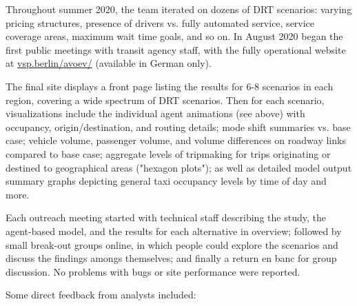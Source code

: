Throughout summer 2020, the team iterated on dozens of DRT scenarios: varying pricing structures, presence of drivers vs. fully automated service, service coverage areas, maximum wait time goals, and so on. In August 2020 began the first public meetings with transit agency staff, with the fully operational website at \href{https://vsp.berlin/avoev}{vsp.berlin/avoev/} (available in German only).

The final site displays a front page listing the results for 6-8 scenarios in each region, covering a wide spectrum of DRT scenarios. Then for each scenario, visualizations include the individual agent animations (see above) with occupancy, origin/destination, and routing details; mode shift summaries vs. base case; vehicle volume, passenger volume, and volume differences on roadway links compared to base case; aggregate levels of tripmaking for trips originating or destined to geographical areas ("hexagon plots"); as well as detailed model output summary graphs depicting general taxi occupancy levels by time of day and more.

Each outreach meeting started with technical staff describing the study, the agent-based model, and the results for each alternative in overview; followed by small break-out groups online, in which people could explore the scenarios and discuss the findings amongs themselves; and finally a return en banc for group discussion. No problems with bugs or site performance were reported.

Some direct feedback from analysts included:

